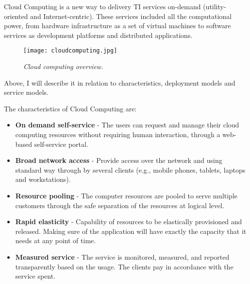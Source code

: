 Cloud Computing is a new way to delivery TI services on-demand (utility-oriented and Internet-centric). These services included all the computational power, from hardware infrastructure as a set of virtual machines to software services as development platforms and distributed applications.

\begin{figure}[!ht]
\begin{center}
\texttt{[image: cloudcomputing.jpg]}
\caption{\small \sl Cloud computing overview.\label{fig:cloudcomputing}}
\end{center}
\end{figure}

Above, I will describe it in relation to characteristics, deployment models and service models\cite{schouten2013ibm}.

The characteristics of Cloud Computing are:
\begin{itemize}
	\item \textbf{On demand self-service} 	- The users can request and manage their cloud computing resources without requiring human interaction, through a web-based self-service portal.
	\item \textbf{Broad network access 	}	- Provide access over the network and using standard way through by several clients (e.g., mobile phones, tablets, laptops and workstations).
	\item \textbf{Resource pooling 		}	- The computer resources are pooled to serve multiple customers through the safe separation of the resources at logical level.
	\item \textbf{Rapid elasticity 		}	- Capability of resources to be elastically provisioned and released. Making sure of the application will have exactly the capacity that it needs at any point of time.
	\item \textbf{Measured service 		}	- The service is monitored, measured, and reported transparently based on the usage. The clients pay in accordance with the service spent.
\end{itemize}

